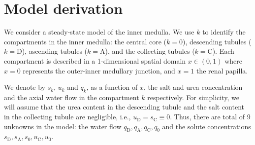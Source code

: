 \documentclass{article}
\numberwithin{equation}{section} %
\begin{document}
\section{Model derivation}


We consider a steady-state model of the inner medulla.
We use $k$ to identify the compartments in the inner medulla: the central core ($k=0$), descending tubules ($k=\mathrm{D}$), ascending tubules ($k=\mathrm{A}$), and the collecting tubules ($k=\mathrm{C}$).
Each compartment is described in a 1-dimensional spatial domain $x\in (0,1)$ where $x=0$ represents the outer-inner medullary junction, and $x=1$ the renal papilla.

We denote by $s_k$, $u_k$ and $q_k$, as a function of $x$, the salt and urea concentration and the axial water flow in the compartment $k$ respectively.
For simplicity, we will assume that the urea content in the descending tubule and the salt content in the collecting tubule are negligible, i.e., $u_\mathrm{D}=s_\mathrm{C}\equiv 0$.
Thus, there are total of 9 unknowns in the model: the water flow $q_\mathrm{D},q_\mathrm{A},q_\mathrm{C},q_0$ and the solute concentrations $s_\mathrm{D},s_\mathrm{A},s_0,u_\mathrm{C},u_0$.
\end{document}
